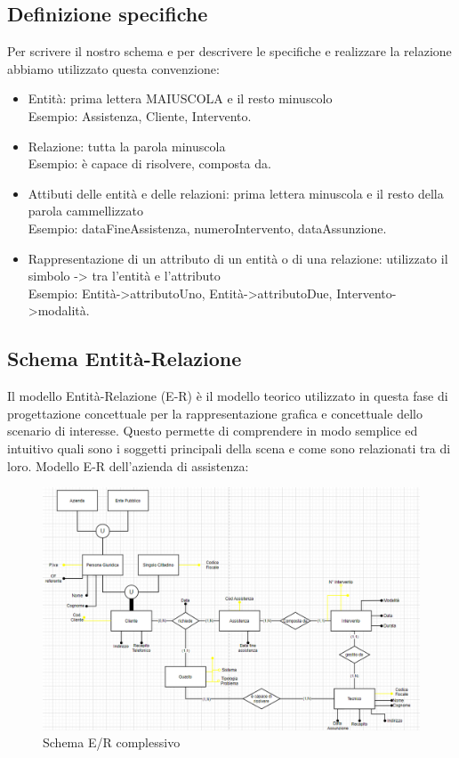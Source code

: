 \documentclass[legalpaper]{article}
\begin{document}
\subsection{Definizione specifiche}
Per scrivere il nostro schema e per descrivere le specifiche e realizzare la relazione abbiamo utilizzato questa convenzione:
\begin{itemize}
	\item Entità: prima lettera MAIUSCOLA e il resto minuscolo\\
	Esempio: Assistenza, Cliente, Intervento.
	\item Relazione: tutta la parola minuscola\\
	Esempio: è capace di risolvere, composta da.
	\item Attibuti delle entità e delle relazioni: prima lettera minuscola e il resto della parola cammellizzato\\
	Esempio: dataFineAssistenza, numeroIntervento, dataAssunzione.
	\item Rappresentazione di un attributo di un entità o di una relazione: utilizzato il simbolo      ->      tra l'entità e l'attributo\\
	Esempio: Entità->attributoUno, Entità->attributoDue, Intervento->modalità.
\end{itemize}
\newpage
\subsection{Schema Entità-Relazione}
Il modello Entità-Relazione (E-R) è il modello teorico utilizzato in questa fase di progettazione concettuale per la rappresentazione grafica e concettuale dello scenario di interesse. Questo permette di comprendere in modo semplice ed intuitivo quali sono i soggetti principali della scena e come sono relazionati tra di loro. 
Modello E-R dell'azienda di assistenza:
\newline

\begin{figure}[ht]
	\centering
	\includegraphics[width=0.7\linewidth]{../Parata/ER_prototipo_v2}
	\caption[]{Schema E/R complessivo}
	\label{fig:erprototipov2}
\end{figure}
\end{document}
